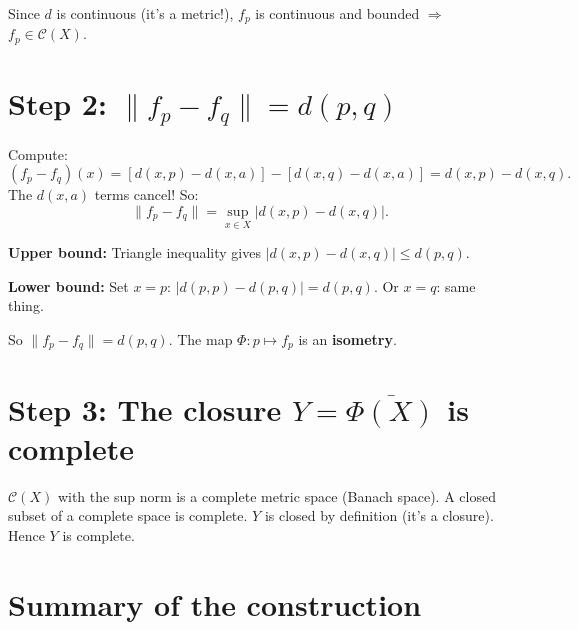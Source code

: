 \documentclass[12pt]{article}
\begin{document}
Since $d$ is continuous (it's a metric!), $f_p$ is continuous and bounded $\Rightarrow$ $f_p \in \mathscr{C}(X)$.

\section*{Step 2: $\|f_p - f_q\| = d(p,q)$}

Compute:
$$
(f_p - f_q)(x) = [d(x,p) - d(x,a)] - [d(x,q) - d(x,a)] = d(x,p) - d(x,q).
$$
The $d(x,a)$ terms cancel! So:
$$
\|f_p - f_q\| = \sup_{x \in X} |d(x,p) - d(x,q)|.
$$

\textbf{Upper bound:} Triangle inequality gives $|d(x,p) - d(x,q)| \leq d(p,q)$.

\textbf{Lower bound:} Set $x = p$: $|d(p,p) - d(p,q)| = d(p,q)$. Or $x = q$: same thing.

So $\|f_p - f_q\| = d(p,q)$. The map $\Phi: p \mapsto f_p$ is an \textbf{isometry}.

\section*{Step 3: The closure $Y = \overline{\Phi(X)}$ is complete}

$\mathscr{C}(X)$ with the sup norm is a complete metric space (Banach space). A closed subset of a complete space is complete. $Y$ is closed by definition (it's a closure). Hence $Y$ is complete.

\section*{Summary of the construction}

\begin{center}
\end{center}
\end{document}
